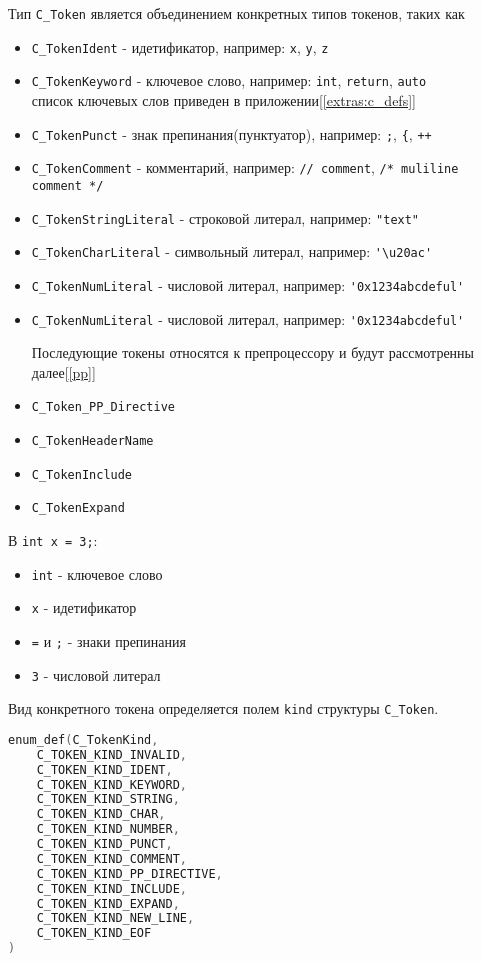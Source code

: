 Тип \verb|C_Token| является объединением конкретных типов токенов, таких как
\begin{itemize}
  \item \verb|C_TokenIdent| - идетификатор, например:
  \verb|x|, \verb|y|, \verb|z|

  \item \verb|C_TokenKeyword| - ключевое слово, например:
  \verb|int|, \verb|return|, \verb|auto| \\
  список ключевых слов приведен в приложении[\ref{extras:c_defs}]

  \item \verb|C_TokenPunct| - знак препинания(пунктуатор), например:
  \verb|;|, \verb|{|, \verb|++|

  \item \verb|C_TokenComment| - комментарий, например:
  \verb|// comment|, \verb|/* muliline comment */|

  \item \verb|C_TokenStringLiteral| - строковой литерал, например: \verb|"text"|
  \item \verb|C_TokenCharLiteral| - символьный литерал, например: \verb|'\u20ac'|
  \item \verb|C_TokenNumLiteral| - числовой литерал, например: \verb|'0x1234abcdeful'|
  \item \verb|C_TokenNumLiteral| - числовой литерал, например: \verb|'0x1234abcdeful'|

  Последующие токены относятся к препроцессору и будут рассмотренны далее[\ref{pp}]
  \item \verb|C_Token_PP_Directive|
  \item \verb|C_TokenHeaderName|
  \item \verb|C_TokenInclude|
  \item \verb|C_TokenExpand|
\end{itemize}

В \verb|int x = 3;|: 
\begin{itemize}
    \item \verb|int| - ключевое слово 
    \item \verb|x| - идетификатор 
    \item \verb|=| и \verb|;| - знаки препинания 
    \item \verb|3| - числовой литерал
\end{itemize}

Вид конкретного токена определяется полем \verb|kind| структуры \verb|C_Token|.
\begin{lstlisting}[language=c, caption={Виды токенов Си}, label={lexing:kind-enum}]
enum_def(C_TokenKind, 
    C_TOKEN_KIND_INVALID,
    C_TOKEN_KIND_IDENT,
    C_TOKEN_KIND_KEYWORD,
    C_TOKEN_KIND_STRING,
    C_TOKEN_KIND_CHAR,
    C_TOKEN_KIND_NUMBER,
    C_TOKEN_KIND_PUNCT,
    C_TOKEN_KIND_COMMENT,
    C_TOKEN_KIND_PP_DIRECTIVE,
    C_TOKEN_KIND_INCLUDE,
    C_TOKEN_KIND_EXPAND,
    C_TOKEN_KIND_NEW_LINE,
    C_TOKEN_KIND_EOF
)
\end{lstlisting}


